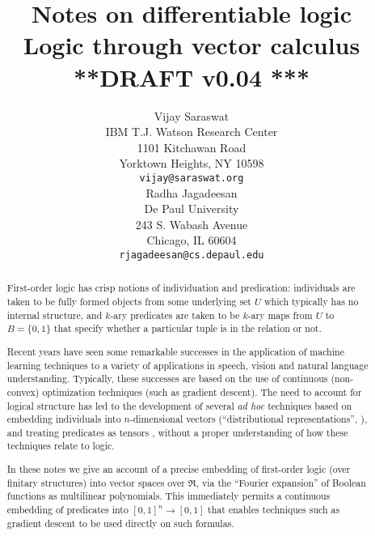 \documentclass{article} %
\newcommand{\keywords}[1]{\par\addvspace\baselineskip
\noindent\keywordname\enspace\ignorespaces#1}
\begin{document}
%

\long{}
\def\mtimes{}
\def\LL#1{#1}
\title{Notes on differentiable logic \\
{\small Logic through vector calculus} \\
{\small ***DRAFT v0.04 ***}}

\author{Vijay Saraswat \\
IBM T.J. Watson Research Center\\
1101 Kitchawan Road\\
Yorktown Heights, NY 10598 \\
\texttt{vijay@saraswat.org} \\
\And
Radha Jagadeesan \\
De Paul University \\
243 S. Wabash Avenue \\
Chicago, IL 60604 \\
\texttt{rjagadeesan@cs.depaul.edu}
}

\newcommand{\fix}{\marginpar{FIX}}
\newcommand{\new}{\marginpar{NEW}}

\nipsfinalcopy %

\maketitle

\begin{abstract}
First-order logic has crisp notions of individuation and predication: individuals are taken  to be fully formed objects from some underlying set $U$ which typically has no internal structure, and $k$-ary predicates are taken to be $k$-ary maps from $U$ to $B=\{0,1\}$ that specify whether a particular tuple is in the relation or not. 

Recent years have seen some remarkable successes in the application of machine learning techniques to a variety of applications in speech, vision and natural language understanding. Typically, these successes are based on the use of continuous (non-convex) optimization techniques (such as gradient descent). The need to account for logical structure has led to the development of several {\em ad hoc} techniques based on embedding individuals into $n$-dimensional vectors (``distributional representations'', \cite{unified-arch-nlp,mikolov-word-vec,baroni2014don}), and treating predicates as tensors \cite{coecke-2010,grefenstette-2013,socher-ntn-2013,bishan-iclr15,rocktaschel-2015,order-embedding-kiros,TransIE}, without a proper understanding of how these techniques relate to logic. 

In these notes we give an account of a precise embedding of first-order logic (over finitary structures) into vector spaces over $\Re$, via the ``Fourier expansion'' of Boolean functions as multilinear polynomials. This immediately permits a continuous embedding of predicates into $[0,1]^n \rightarrow [0,1]$ that enables techniques such as gradient descent to be used directly on such formulas.

\end{abstract}
\end{document}
